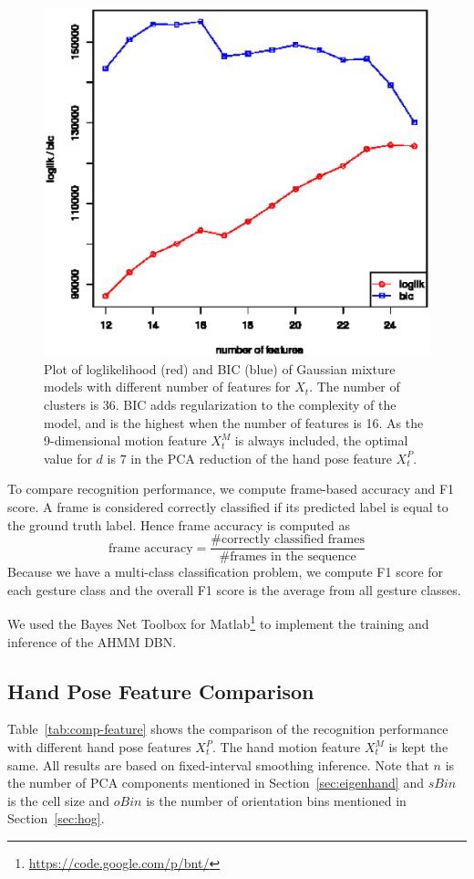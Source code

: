 \documentclass{acm_proc_article-sp}
\begin{document}
\begin{figure}
\centering
\includegraphics[width=1\columnwidth]{fig/loglik-feature-1.ps}
\caption{Plot of loglikelihood (red) and BIC (blue) of Gaussian mixture models with different
number of features for $X_t$. The number of clusters is $36$. BIC adds regularization to the 
complexity of the model, and is the highest when the number of features
is 16. As the 9-dimensional motion feature $X_t^M$ is always included, the optimal value for $d$ is $7$ in the PCA reduction 
of the hand pose feature $X_t^P$.}
\label{fig:bic}
\end{figure}

To compare recognition performance, we compute frame-based accuracy and F1 score. 
A frame is considered correctly classified if its predicted label is equal to the ground truth label.
Hence frame accuracy is computed as
\begin{displaymath}
\text{frame accuracy} = \frac{\text{\# correctly classified frames}}{\text{\# frames in the sequence}}
\end{displaymath}
Because we have a multi-class classification problem, we compute F1 score for each gesture class and 
the overall F1 score is the average from all gesture classes.

We used the Bayes Net Toolbox for Matlab\footnote{\url{https://code.google.com/p/bnt/}} to implement the training
and inference of the AHMM DBN.

\subsection{Hand Pose Feature Comparison}
Table~\ref{tab:comp-feature} shows the comparison of the recognition performance with different hand pose features $X_t^P$. The 
hand motion feature $X_t^M$ is kept the same. All results are based on fixed-interval smoothing inference.
Note that $n$ is the number of PCA components mentioned in Section~\ref{sec:eigenhand} and $sBin$ is the
cell size and $oBin$ is the number of orientation bins mentioned in Section~\ref{sec:hog}.
\end{document}
